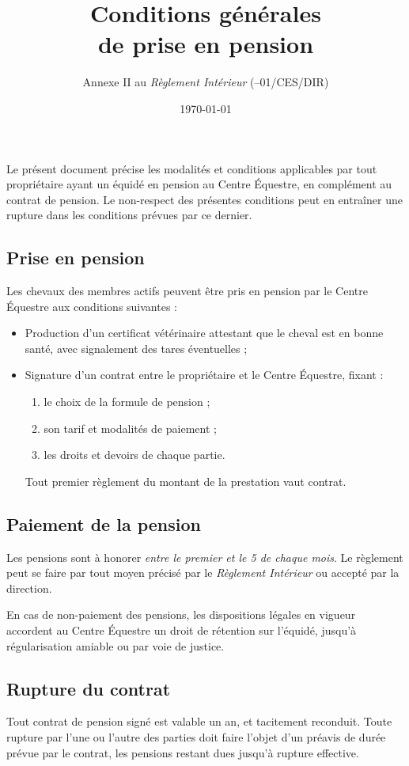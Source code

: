 \documentclass[11pt,a4paper]{article}
\title[Conditions générales de prise en pension\\ version du \today]{Conditions générales \\ de prise en pension}
\subtitle{Annexe II au \textit{Règlement Intérieur} (\no 26--01/CES/DIR)}
\author{}
\date{\today}
\begin{document}
   \annexHeader{}
   \maketitle

   Le présent document précise les modalités et conditions applicables par tout propriétaire ayant un équidé en pension au Centre Équestre, en complément au contrat de pension.
   Le non-respect des présentes conditions peut en entraîner une rupture dans les conditions prévues par ce dernier.

   \subsection*{Prise en pension}
   Les chevaux des membres actifs peuvent être pris en pension par le Centre Équestre aux conditions suivantes :
   \begin{itemize}
      \item
      Production d'un certificat vétérinaire attestant que le cheval est en bonne santé, avec signalement des tares éventuelles ;
      \item
      Signature d'un contrat entre le propriétaire et le Centre Équestre, fixant :
      \begin{enumerate}
         \item
         le choix de la formule de pension ;
         \item
         son tarif et modalités de paiement ;
         \item
         les droits et devoirs de chaque partie.
      \end{enumerate}
      Tout premier règlement du montant de la prestation vaut contrat.
   \end{itemize}

   \subsection*{Paiement de la pension}
   Les pensions sont à honorer \emph{entre le premier et le 5 de chaque mois}.
   Le règlement peut se faire par tout moyen précisé par le \textit{Règlement Intérieur} ou accepté par la direction.

   En cas de non-paiement des pensions, les dispositions légales en vigueur accordent au Centre Équestre un droit de rétention sur l'équidé, jusqu'à régularisation amiable ou par voie de justice.

   \subsection*{Rupture du contrat}
   Tout contrat de pension signé est valable un an, et tacitement reconduit.
   Toute rupture par l'une ou l'autre des parties doit faire l'objet d'un préavis de durée prévue par le contrat, les pensions restant dues jusqu'à rupture effective.
\end{document}
